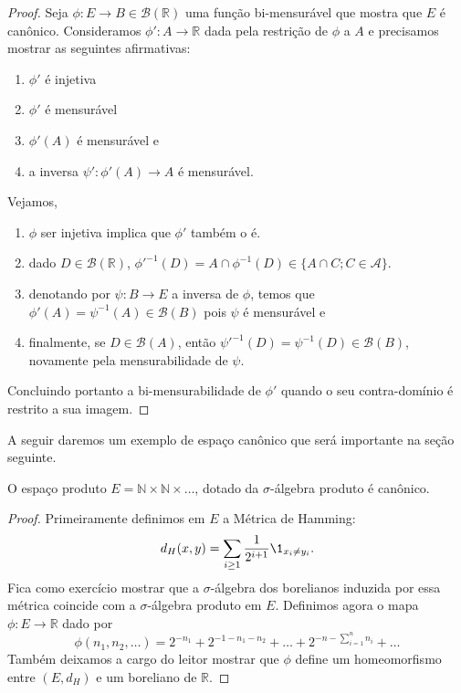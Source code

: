 \begin{proof}
  Seja $\phi: E \to B \in \mathcal{B}(\mathbb{R})$ uma função bi-mensurável que mostra que $E$ é canônico.
  Consideramos $\phi': A \to \mathbb{R}$ dada pela restrição de $\phi$ a $A$ e precisamos mostrar as seguintes afirmativas:
  \begin{enumerate}[\quad a)]
  \item $\phi'$ é injetiva
  \item $\phi'$ é mensurável
  \item $\phi'(A)$ é mensurável e
  \item a inversa $\psi': \phi'(A) \to A$ é mensurável.
  \end{enumerate}
  Vejamos,
  \begin{enumerate}[\quad a)]
  \item $\phi$ ser injetiva implica que $\phi'$ também o é.
  \item dado $D \in \mathcal{B}(\mathbb{R})$, $\phi'^{-1}(D) = A \cap \phi^{-1}(D) \in \{A \cap C; C \in \mathcal{A}\}$.
  \item denotando por $\psi: B \to E$ a inversa de $\phi$, temos que $\phi'(A) = \psi^{-1}(A) \in \mathcal{B}(B)$ pois $\psi$ é mensurável e
  \item finalmente, se $D \in \mathcal{B}(A)$, então $\psi'^{-1}(D) = \psi^{-1}(D) \in \mathcal{B}(B)$, novamente pela mensurabilidade de $\psi$.
  \end{enumerate}
  Concluindo portanto a bi-mensurabilidade de $\phi'$ quando o seu contra-domínio é restrito a sua imagem.
\end{proof}

A seguir daremos um exemplo de espaço canônico que será importante na seção seguinte.

\begin{lemma}
  \label{l:NN_canonico}
  O espaço produto $E = \mathbb{N} \times \mathbb{N} \times \dots$, dotado da $\sigma$-álgebra produto é canônico.
\end{lemma}

\begin{proof}
  Primeiramente definimos em $E$ a Métrica de Hamming:
  \begin{equation}
    \label{e:hamming_distance}
    d_H(x,y) = \sum_{i \geq 1} \frac{1}{2^{i + 1}} \1_{x_i \neq y_i}.
  \end{equation}
  Fica como exercício mostrar que a $\sigma$-álgebra dos borelianos induzida por essa métrica coincide com a $\sigma$-álgebra produto em $E$.
  Definimos agora o mapa $\phi:E \to \mathbb{R}$ dado por
  \begin{equation}
    \phi(n_1, n_2, \dots) = 2^{-n_1} + 2^{-1 - n_1 - n_2} + \dots + 2^{-n - \sum_{i=1}^n n_i} + \dots
  \end{equation}
  Também deixamos a cargo do leitor mostrar que $\phi$ define um homeomorfismo entre $(E,d_H)$ e um boreliano de $\mathbb{R}$.
\end{proof}

